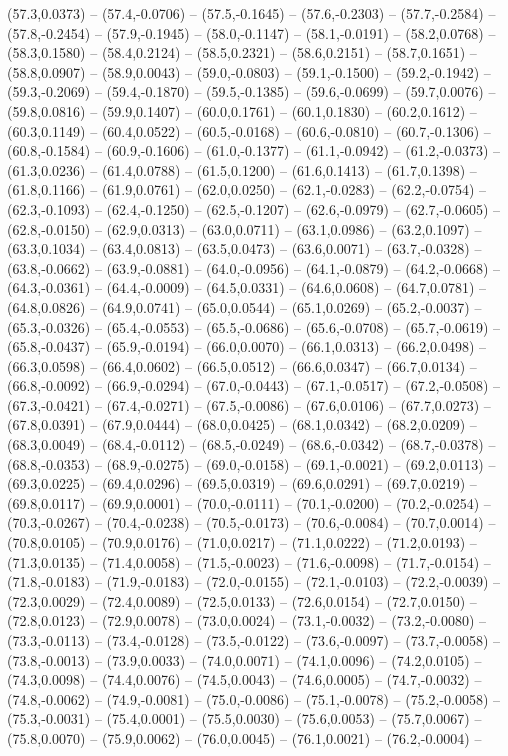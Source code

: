 \documentclass{SVnote}
\begin{document}
(57.3,0.0373) -- (57.4,-0.0706) -- (57.5,-0.1645) -- (57.6,-0.2303) -- (57.7,-0.2584) -- (57.8,-0.2454) -- (57.9,-0.1945) -- (58.0,-0.1147) -- (58.1,-0.0191) -- (58.2,0.0768) -- (58.3,0.1580) -- (58.4,0.2124) -- (58.5,0.2321) -- (58.6,0.2151) -- (58.7,0.1651) -- (58.8,0.0907) -- (58.9,0.0043) -- (59.0,-0.0803) -- (59.1,-0.1500) -- (59.2,-0.1942) -- (59.3,-0.2069) -- (59.4,-0.1870) -- (59.5,-0.1385) -- (59.6,-0.0699) -- (59.7,0.0076) -- (59.8,0.0816) -- (59.9,0.1407) -- (60.0,0.1761) -- (60.1,0.1830) -- (60.2,0.1612) -- (60.3,0.1149) -- (60.4,0.0522) -- (60.5,-0.0168) -- (60.6,-0.0810) -- (60.7,-0.1306) -- (60.8,-0.1584) -- (60.9,-0.1606) -- (61.0,-0.1377) -- (61.1,-0.0942) -- (61.2,-0.0373) -- (61.3,0.0236) -- (61.4,0.0788) -- (61.5,0.1200) -- (61.6,0.1413) -- (61.7,0.1398) -- (61.8,0.1166) -- (61.9,0.0761) -- (62.0,0.0250) -- (62.1,-0.0283) -- (62.2,-0.0754) -- (62.3,-0.1093) -- (62.4,-0.1250) -- (62.5,-0.1207) -- (62.6,-0.0979) -- (62.7,-0.0605) -- (62.8,-0.0150) -- (62.9,0.0313) -- (63.0,0.0711) -- (63.1,0.0986) -- (63.2,0.1097) -- (63.3,0.1034) -- (63.4,0.0813) -- (63.5,0.0473) -- (63.6,0.0071) -- (63.7,-0.0328) -- (63.8,-0.0662) -- (63.9,-0.0881) -- (64.0,-0.0956) -- (64.1,-0.0879) -- (64.2,-0.0668) -- (64.3,-0.0361) -- (64.4,-0.0009) -- (64.5,0.0331) -- (64.6,0.0608) -- (64.7,0.0781) -- (64.8,0.0826) -- (64.9,0.0741) -- (65.0,0.0544) -- (65.1,0.0269) -- (65.2,-0.0037) -- (65.3,-0.0326) -- (65.4,-0.0553) -- (65.5,-0.0686) -- (65.6,-0.0708) -- (65.7,-0.0619) -- (65.8,-0.0437) -- (65.9,-0.0194) -- (66.0,0.0070) -- (66.1,0.0313) -- (66.2,0.0498) -- (66.3,0.0598) -- (66.4,0.0602) -- (66.5,0.0512) -- (66.6,0.0347) -- (66.7,0.0134) -- (66.8,-0.0092) -- (66.9,-0.0294) -- (67.0,-0.0443) -- (67.1,-0.0517) -- (67.2,-0.0508) -- (67.3,-0.0421) -- (67.4,-0.0271) -- (67.5,-0.0086) -- (67.6,0.0106) -- (67.7,0.0273) -- (67.8,0.0391) -- (67.9,0.0444) -- (68.0,0.0425) -- (68.1,0.0342) -- (68.2,0.0209) -- (68.3,0.0049) -- (68.4,-0.0112) -- (68.5,-0.0249) -- (68.6,-0.0342) -- (68.7,-0.0378) -- (68.8,-0.0353) -- (68.9,-0.0275) -- (69.0,-0.0158) -- (69.1,-0.0021) -- (69.2,0.0113) -- (69.3,0.0225) -- (69.4,0.0296) -- (69.5,0.0319) -- (69.6,0.0291) -- (69.7,0.0219) -- (69.8,0.0117) -- (69.9,0.0001) -- (70.0,-0.0111) -- (70.1,-0.0200) -- (70.2,-0.0254) -- (70.3,-0.0267) -- (70.4,-0.0238) -- (70.5,-0.0173) -- (70.6,-0.0084) -- (70.7,0.0014) -- (70.8,0.0105) -- (70.9,0.0176) -- (71.0,0.0217) -- (71.1,0.0222) -- (71.2,0.0193) -- (71.3,0.0135) -- (71.4,0.0058) -- (71.5,-0.0023) -- (71.6,-0.0098) -- (71.7,-0.0154) -- (71.8,-0.0183) -- (71.9,-0.0183) -- (72.0,-0.0155) -- (72.1,-0.0103) -- (72.2,-0.0039) -- (72.3,0.0029) -- (72.4,0.0089) -- (72.5,0.0133) -- (72.6,0.0154) -- (72.7,0.0150) -- (72.8,0.0123) -- (72.9,0.0078) -- (73.0,0.0024) -- (73.1,-0.0032) -- (73.2,-0.0080) -- (73.3,-0.0113) -- (73.4,-0.0128) -- (73.5,-0.0122) -- (73.6,-0.0097) -- (73.7,-0.0058) -- (73.8,-0.0013) -- (73.9,0.0033) -- (74.0,0.0071) -- (74.1,0.0096) -- (74.2,0.0105) -- (74.3,0.0098) -- (74.4,0.0076) -- (74.5,0.0043) -- (74.6,0.0005) -- (74.7,-0.0032) -- (74.8,-0.0062) -- (74.9,-0.0081) -- (75.0,-0.0086) -- (75.1,-0.0078) -- (75.2,-0.0058) -- (75.3,-0.0031) -- (75.4,0.0001) -- (75.5,0.0030) -- (75.6,0.0053) -- (75.7,0.0067) -- (75.8,0.0070) -- (75.9,0.0062) -- (76.0,0.0045) -- (76.1,0.0021) -- (76.2,-0.0004) -- 
\end{document}
